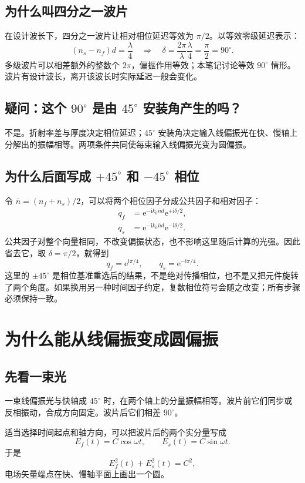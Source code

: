 \documentclass[UTF8,fontset=fandol,11pt,a4paper]{ctexart}
\newcommand{\ii}{\mathrm i}
\newcommand{\ee}{\mathrm e}
\newcommand{\quest}[2]{\subsection*{疑问：#1}#2}
\begin{document}
\subsection{为什么叫四分之一波片}
在设计波长下，四分之一波片让相对相位延迟等效为 $\pi/2$。以等效零级延迟表示：
\begin{equation}
(n_s-n_f)d=\frac{\lambda}{4}
\quad\Longrightarrow\quad
\delta=\frac{2\pi}{\lambda}\frac{\lambda}{4}=\frac\pi2=90^\circ.
\end{equation}
多级波片可以相差额外的整数个 $2\pi$，偏振作用等效；本笔记讨论等效 $90^\circ$ 情形。波片有设计波长，离开该波长时实际延迟一般会变化。

\quest{这个 $90^\circ$ 是由 $45^\circ$ 安装角产生的吗？}{
不是。折射率差与厚度决定相位延迟；$45^\circ$ 安装角决定输入线偏振光在快、慢轴上分解出的振幅相等。两项条件共同使每束输入线偏振光变为圆偏振。}

\subsection{为什么后面写成 $+45^\circ$ 和 $-45^\circ$ 相位}
令 $\bar n=(n_f+n_s)/2$，可以将两个相位因子分成公共因子和相对因子：
\begin{align}
q_f&=\ee^{-\ii k_0\bar n d}\ee^{+\ii\delta/2},\\
q_s&=\ee^{-\ii k_0\bar n d}\ee^{-\ii\delta/2}.
\end{align}
公共因子对整个向量相同，不改变偏振状态，也不影响这里随后计算的光强。因此省去它，取 $\delta=\pi/2$，就得到
\begin{equation}
\boxed{q_f=\ee^{\ii\pi/4},\qquad q_s=\ee^{-\ii\pi/4}.}
\end{equation}
这里的 $\pm45^\circ$ 是相位基准重选后的结果，不是绝对传播相位，也不是又把元件旋转了两个角度。如果换用另一种时间因子约定，复数相位符号会随之改变；所有步骤必须保持一致。

\clearpage
\section{为什么能从线偏振变成圆偏振}
\subsection{先看一束光}
一束线偏振光与快轴成 $45^\circ$ 时，在两个轴上的分量振幅相等。波片前它们同步或反相振动，合成方向固定。波片后它们相差 $90^\circ$。

适当选择时间起点和轴方向，可以把波片后的两个实分量写成
\begin{equation}
E_f(t)=C\cos\omega t,\qquad E_s(t)=C\sin\omega t.
\end{equation}
于是
\begin{equation}
E_f^2(t)+E_s^2(t)=C^2,
\end{equation}
电场矢量端点在快、慢轴平面上画出一个圆。
\end{document}
